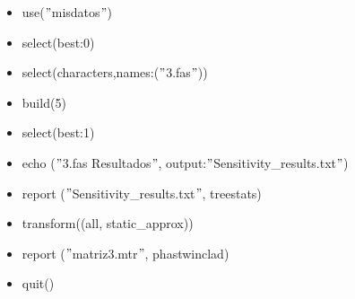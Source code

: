 {\begin{itemize}[label=$>$]
         \item use($"$misdatos$"$)
         \item select(best:0)
         \item select(characters,names:($"$3.fas$"$))
         \item build(5)
         \item select(best:1)
         \item echo ($"$3.fas Resultados$"$, 
         output:$"$Sensitivity\_results.txt$"$)
         \item report ($"$Sensitivity\_results.txt$"$, treestats)
         \item transform((all, static\_approx))
         \item report ($"$matriz3.mtr$"$, phastwinclad)
         \item quit()
       \end{itemize} 
       }